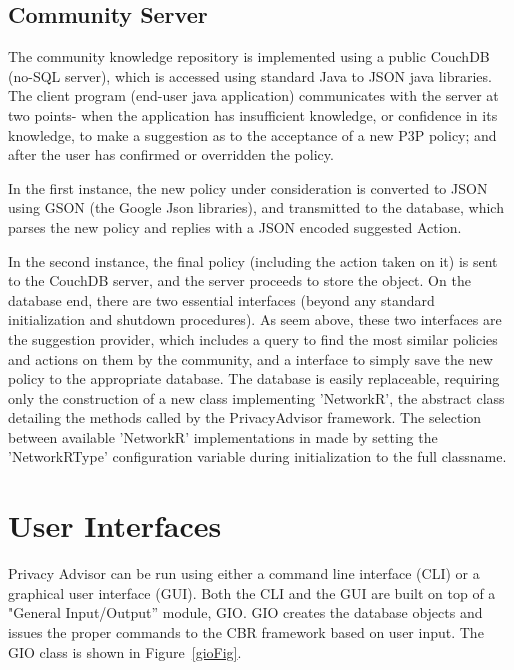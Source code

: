 \subsection{Community Server} %
The community knowledge repository is implemented using a public CouchDB (no-SQL server), which is accessed using standard Java to JSON java libraries. The client program (end-user java application) communicates with the server at two points- when the application has insufficient knowledge, or confidence in its knowledge, to make a suggestion as to the acceptance of a new P3P policy; and after the user has confirmed or overridden the policy.

In the first instance, the new policy under consideration is converted to JSON using GSON (the Google Json libraries), and transmitted to the database, which parses the new policy and replies with a JSON encoded suggested Action.

In the second instance, the final policy (including the action taken on it) is sent to the CouchDB server, and the server proceeds to store the object.
On the database end, there are two essential interfaces (beyond any standard initialization and shutdown procedures). As seem above, these two interfaces are the suggestion provider, which includes a query to find the most similar policies and actions on them by the community, and a interface to simply save the new policy to the appropriate database.
The database is easily replaceable, requiring only the construction of a new class implementing 'NetworkR', the abstract class detailing the methods called by the PrivacyAdvisor framework. The selection between available 'NetworkR' implementations in made by setting the 'NetworkRType' configuration variable during initialization to the full classname.





\section{User Interfaces}
Privacy Advisor can be run using either a command line interface (CLI) or a graphical user interface (GUI). Both the CLI and the GUI are built on top of a "General Input/Output'' module, GIO. GIO creates the database objects and issues the proper commands to the CBR framework based on user input. The GIO class is shown in Figure~\ref{gioFig}. 


